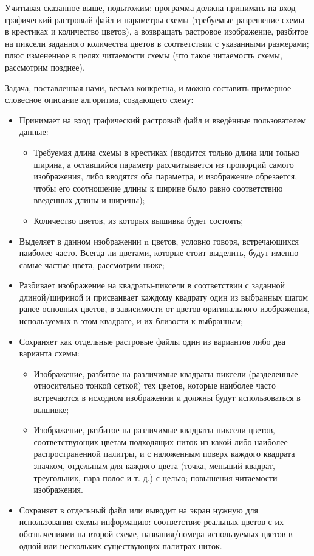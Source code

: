 \documentclass[12pt]{article}
\begin{document}
{	Учитывая сказанное выше, подытожим: программа должна принимать на вход графический растровый файл и параметры схемы (требуемые разрешение схемы в крестиках и количество цветов), а возвращать растровое изображение, разбитое на пиксели заданного количества цветов в соответствии с указанными размерами; плюс измененное в целях читаемости схемы (что такое читаемость схемы, рассмотрим позднее).
	
	Задача, поставленная нами, весьма конкретна, и можно составить примерное словесное описание алгоритма, создающего схему:
	
	\begin{itemize}
	\item Принимает на вход графический растровый файл и введённые пользователем данные: 
		\begin{itemize}
		\item Требуемая длина схемы в крестиках (вводится только длина или только ширина, а оставшийся параметр рассчитывается из пропорций самого изображения, либо вводятся оба параметра, и изображение обрезается, чтобы его соотношение длины к ширине было равно соответствию введенных длины и ширины);
	
		\item Количество цветов, из которых вышивка будет состоять;
		\end{itemize}
	\item Выделяет в данном изображении n цветов, условно говоря, встречающихся наиболее часто. Всегда ли цветами, которые стоит выделить, будут именно самые частые цвета, рассмотрим ниже;
	
	\item Разбивает изображение на квадраты-пиксели в соответствии с заданной длиной/шириной и присваивает каждому квадрату один из выбранных шагом ранее основных цветов, в зависимости от цветов оригинального изображения, используемых в этом квадрате, и их близости к выбранным;
	
	\item Сохраняет как отдельные растровые файлы один из вариантов либо два варианта схемы:
		\begin{itemize}
		\item Изображение, разбитое на различимые квадраты-пиксели (разделенные относительно тонкой сеткой) тех цветов, которые наиболее часто встречаются в исходном изображении и должны будут использоваться в вышивке;
	
		\item Изображение, разбитое на различимые квадраты-пиксели цветов, соответствующих цветам подходящих ниток из какой-либо наиболее распространенной палитры, и с наложенным поверх каждого квадрата значком, отдельным для каждого цвета (точка, меньший квадрат, треугольник, пара полос и т. д.) с целью; повышения читаемости изображения.
		\end{itemize}
	\item Сохраняет в отдельный файл или выводит на экран нужную для использования схемы информацию: соответствие реальных цветов с их обозначениями на второй схеме, названия/номера используемых цветов в одной или нескольких существующих палитрах ниток.
	\end{itemize}
	
}
\end{document}
